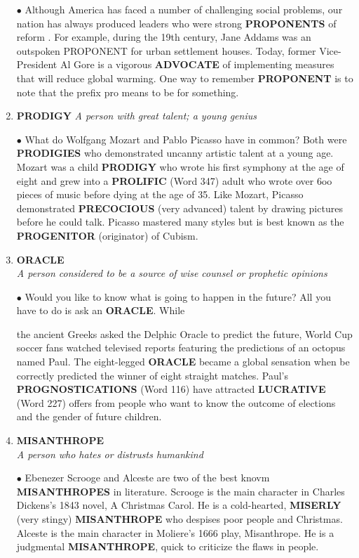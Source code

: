\documentclass{book}
\begin{document}
\begin{enumerate}
$ \bullet $ Although America has faced a number of challenging
social problems, our nation has always produced
leaders who were strong \textbf{PROPONENTS} of reform .
For example, during the 19th century, Jane Addams
was an outspoken PROPONENT for urban settlement
houses. Today, former Vice-President Al Gore is a
vigorous \textbf{ADVOCATE} of implementing measures that
will reduce global warming. One way to remember
\textbf{PROPONENT} is to note that the prefix pro means to
be for something.

\item \textbf{PRODIGY}
\textit{A person with great talent; a young genius}

$ \bullet $ What do Wolfgang Mozart and Pablo Picasso have in
common? Both were \textbf{PRODIGIES} who demonstrated
uncanny artistic talent at a young age. Mozart was a
child \textbf{PRODIGY} who wrote his first symphony at the
age of eight and grew into a \textbf{PROLIFIC} (Word 347)
adult who wrote over 6oo pieces of music before
dying at the age of 35. Like Mozart, Picasso
demonstrated \textbf{PRECOCIOUS} (very advanced) talent
by drawing pictures before he could talk. Picasso
mastered many styles but is best known as the
\textbf{PROGENITOR} (originator) of Cubism.

 \item\textbf{ORACLE}\\ 
\textit{A person considered to be a source of wise counsel or prophetic opinions}

$ \bullet $ Would you like to know what is going to happen in the
future? All you have to do is ask an \textbf{ORACLE}. While

the ancient Greeks asked the Delphic Oracle to predict
the future, World Cup soccer fans watched televised
reports featuring the predictions of an octopus named
Paul. The eight-legged \textbf{ORACLE} became a global
sensation when be correctly predicted the winner of
eight straight matches. Paul's \textbf{PROGNOSTICATIONS}
(Word 116) have attracted \textbf{LUCRATIVE} (Word 227)
offers from people who want to know the outcome of
elections and the gender of future children.

\item \textbf{MISANTHROPE}\\
\textit{A person who hates or distrusts humankind}

$ \bullet $ Ebenezer Scrooge and Alceste are two of the best
knovm \textbf{MISANTHROPES} in literature. Scrooge is the
main character in Charles Dickens's 1843 novel, A
Christmas Carol. He is a cold-hearted, \textbf{MISERLY}
(very stingy) \textbf{MISANTHROPE} who despises poor
people and Christmas. Alceste is the main character in
Moliere's 1666 play, Misanthrope. He is a judgmental
\textbf{MISANTHROPE}, quick to criticize the flaws in people.


\end{enumerate}
\end{document}
